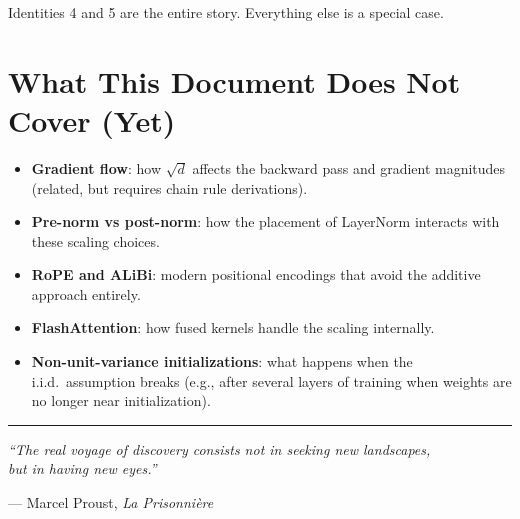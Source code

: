 \documentclass[11pt, a4paper]{article}
\begin{document}
\medskip
\noindent Identities 4 and 5 are the entire story. Everything else is a special case.


\section{What This Document Does Not Cover (Yet)}

\begin{itemize}
\item \textbf{Gradient flow}: how $\sqrt{d}$ affects the backward pass and gradient magnitudes
(related, but requires chain rule derivations).
\item \textbf{Pre-norm vs post-norm}: how the placement of LayerNorm interacts with these scaling choices.
\item \textbf{RoPE and ALiBi}: modern positional encodings that avoid the additive approach entirely.
\item \textbf{FlashAttention}: how fused kernels handle the scaling internally.
\item \textbf{Non-unit-variance initializations}: what happens when the i.i.d.\ assumption breaks
(e.g., after several layers of training when weights are no longer near initialization).
\end{itemize}


\vfill
\begin{center}
\rule{0.5\textwidth}{0.4pt}

\medskip
\emph{``The real voyage of discovery consists not in seeking new landscapes,\\
but in having new eyes.''}

--- Marcel Proust, \textit{La Prisonni\`{e}re}
\end{center}
\end{document}
